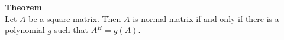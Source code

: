 \documentclass[12pt]{article}
\begin{document}
{\bf Theorem}\\Let $A$ be a square matrix. Then $A$ is normal matrix 
if and only if there is a polynomial $g$ such that $A^H=g(A)$.
\end{document}
